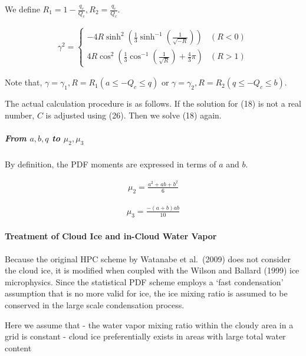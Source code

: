 We define \(R_{1}=1-\frac{q_{c}}{Q_{c}}, R_{2}=\frac{q_{c}}{Q_{c}}\).

\begin{eqnarray}
\gamma^{2}=\left\{\begin{array}{ll}
-4 R \sinh ^{2}\left(\frac{1}{3} \sinh ^{-1}\left(\frac{1}{\sqrt{-R}}\right)\right) & (R<0) \\
4 R \cos ^{2}\left(\frac{1}{3} \cos ^{-1}\left(\frac{1}{\sqrt{R}}\right)+\frac{4}{3} \pi\right) & (R>1)
\end{array}\right.
\label{E08-26}
\end{eqnarray}

Note that,
\(\gamma=\gamma_{1}, R=R_{1}\left(a \leq-Q_{c} \leq q\right)\) or
\(\gamma=\gamma_{2}, R=R_{2}\left(q \leq-Q_{c} \leq b\right)\).

The actual calculation procedure is as follows. If the solution for (18)
is not a real number, \(C\) is adjusted using (26). Then we solve (18)
again.

\hypertarget{from-abq-to-mu_2-mu_3}{%
\subparagraph{\texorpdfstring{From \(a,b,q\) to
\(\mu_{2}, \mu_{3}\)}{From a,b,q to \textbackslash mu\_\{2\}, \textbackslash mu\_\{3\}}}\label{from-abq-to-mu_2-mu_3}}

By definition, the PDF moments are expressed in terms of \(a\) and
\(b\).

\begin{eqnarray}
\mu_{2}=\frac{a^{2}+ab+b^{2}}{6}
\end{eqnarray}

\begin{eqnarray}
\mu_{3}=\frac{-(a+b) ab}{10}
\end{eqnarray}

\hypertarget{treatment-of-cloud-ice-and-in-cloud-water-vapor}{%
\paragraph{Treatment of Cloud Ice and in-Cloud Water
Vapor}\label{treatment-of-cloud-ice-and-in-cloud-water-vapor}}

Because the original HPC scheme by Watanabe et al.~(2009) does not
consider the cloud ice, it is modified when coupled with the Wilson and
Ballard (1999) ice microphysics. Since the statistical PDF scheme
employs a `fast condensation' assumption that is no more valid for ice,
the ice mixing ratio is assumed to be conserved in the large scale
condensation process.

Here we assume that - the water vapor mixing ratio within the cloudy
area in a grid is constant - cloud ice preferentially exists in areas
with large total water content

